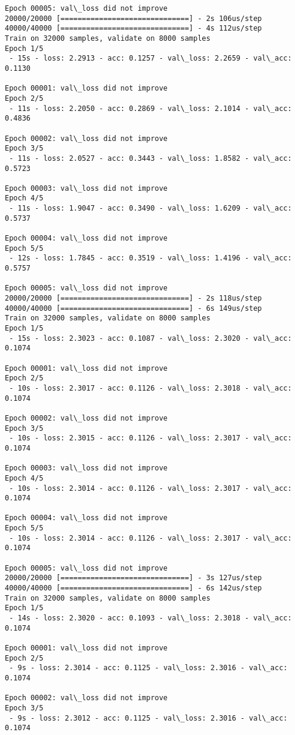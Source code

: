 \documentclass[11pt]{article}
\begin{document}
\begin{Verbatim}[commandchars=\\\{\}]
Epoch 00005: val\_loss did not improve
20000/20000 [==============================] - 2s 106us/step
40000/40000 [==============================] - 4s 112us/step
Train on 32000 samples, validate on 8000 samples
Epoch 1/5
 - 15s - loss: 2.2913 - acc: 0.1257 - val\_loss: 2.2659 - val\_acc: 0.1130

Epoch 00001: val\_loss did not improve
Epoch 2/5
 - 11s - loss: 2.2050 - acc: 0.2869 - val\_loss: 2.1014 - val\_acc: 0.4836

Epoch 00002: val\_loss did not improve
Epoch 3/5
 - 11s - loss: 2.0527 - acc: 0.3443 - val\_loss: 1.8582 - val\_acc: 0.5723

Epoch 00003: val\_loss did not improve
Epoch 4/5
 - 11s - loss: 1.9047 - acc: 0.3490 - val\_loss: 1.6209 - val\_acc: 0.5737

Epoch 00004: val\_loss did not improve
Epoch 5/5
 - 12s - loss: 1.7845 - acc: 0.3519 - val\_loss: 1.4196 - val\_acc: 0.5757

Epoch 00005: val\_loss did not improve
20000/20000 [==============================] - 2s 118us/step
40000/40000 [==============================] - 6s 149us/step
Train on 32000 samples, validate on 8000 samples
Epoch 1/5
 - 15s - loss: 2.3023 - acc: 0.1087 - val\_loss: 2.3020 - val\_acc: 0.1074

Epoch 00001: val\_loss did not improve
Epoch 2/5
 - 10s - loss: 2.3017 - acc: 0.1126 - val\_loss: 2.3018 - val\_acc: 0.1074

Epoch 00002: val\_loss did not improve
Epoch 3/5
 - 10s - loss: 2.3015 - acc: 0.1126 - val\_loss: 2.3017 - val\_acc: 0.1074

Epoch 00003: val\_loss did not improve
Epoch 4/5
 - 10s - loss: 2.3014 - acc: 0.1126 - val\_loss: 2.3017 - val\_acc: 0.1074

Epoch 00004: val\_loss did not improve
Epoch 5/5
 - 10s - loss: 2.3014 - acc: 0.1126 - val\_loss: 2.3017 - val\_acc: 0.1074

Epoch 00005: val\_loss did not improve
20000/20000 [==============================] - 3s 127us/step
40000/40000 [==============================] - 6s 142us/step
Train on 32000 samples, validate on 8000 samples
Epoch 1/5
 - 14s - loss: 2.3020 - acc: 0.1093 - val\_loss: 2.3018 - val\_acc: 0.1074

Epoch 00001: val\_loss did not improve
Epoch 2/5
 - 9s - loss: 2.3014 - acc: 0.1125 - val\_loss: 2.3016 - val\_acc: 0.1074

Epoch 00002: val\_loss did not improve
Epoch 3/5
 - 9s - loss: 2.3012 - acc: 0.1125 - val\_loss: 2.3016 - val\_acc: 0.1074


\end{Verbatim}
\end{document}

